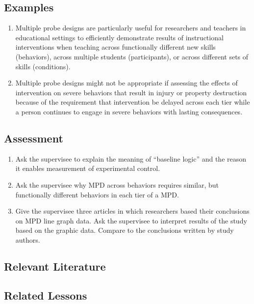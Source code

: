 \subsection{Examples}
\begin{enumerate}
\item Multiple probe designs are particularly useful for researchers and teachers in educational settings to efficiently demonstrate results of instructional interventions when teaching across functionally different new skills (behaviors), across multiple students (participants), or across different sets of skills (conditions).
\item Multiple probe designs might not be appropriate if assessing the effects of intervention on severe behaviors that result in injury or property destruction because of the requirement that intervention be delayed across each tier while a person continues to engage in severe behaviors with lasting consequences.
\end{enumerate}
%
\subsection{Assessment}
\begin{enumerate}
\item Ask the supervisee to explain the meaning of ``baseline logic'' and the reason it enables measurement of experimental control.
\item Ask the supervisee why MPD across behaviors requires similar, but functionally different behaviors in each tier of a MPD.
\item Give the supervisee three articles in which researchers based their conclusions on MPD line graph data. Ask the supervisee to interpret results of the study based on the graphic data. Compare to the conclusions written by study authors.
\end{enumerate}
%
\subsection{Relevant Literature}
\begin{refsection}
\nocite{ledford2009single,horner1978multiple,thompson1982training}
\printbibliography[heading=none]
\end{refsection}
%
\subsection{Related Lessons}
\fourbThree{}\\
\fourbSeven{}\\
\fourhOne{}\\
\fourhTwo{}\\
\fourhFour{}\\
\fouriFive{}\\
\fourFKThirtySix{}\\
%
